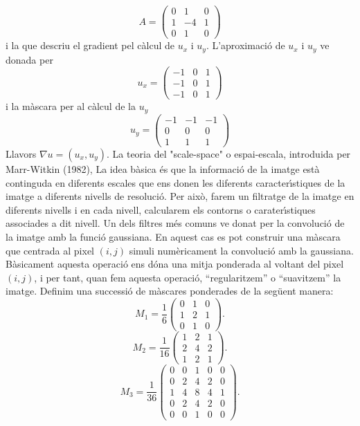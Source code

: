 \documentclass{article}
\begin{document}
$$
A=\left(\begin{array}{ccc}
0 & 1 & 0 \\
1 & -4 & 1 \\
0 & 1 & 0 \end{array}\right)$$
 i la que descriu el gradient pel c\`{a}lcul de $u_x$ i $u_y$. L'aproximaci\'{o} de $u_x$ i $u_y$ ve donada
 per
$$
u_x=\left( \begin{array}{ccc} -1 & 0 & 1\\ -1 & 0 & 1 \\ -1 & 0 & 1 \end{array}\right)
$$ i la m\`{a}scara per al
c\`{a}lcul de la $u_y$
$$
u_y=\left(\begin{array}{ccc} -1 & -1 & -1 \\ 0 & 0 & 0 \\ 1 & 1 & 1 \end{array}\right)$$
 Llavors $\nabla u=(u_x,u_y)$.
\newline La teoria del "scale-space" o espai-escala, introduida per Marr-Witkin (1982),
La idea b\`{a}sica \'{e}s que la informaci\'{o} de la imatge est\`{a} continguda en diferents escales que ens donen
les diferents caracter\'{\i}stiques de la imatge a diferents nivells de resoluci\'{o}. Per aix\`{o}, farem un
filtratge de la imatge en diferents nivells i en cada nivell, calcularem els contorns o
carater\'{\i}stiques associades a dit nivell.
\newline
 Un dels filtres m\'{e}s comuns ve donat per la convoluci\'{o} de la imatge amb la funci\'{o} gaussiana. En
aquest cas es pot construir una m\`{a}scara que centrada al pixel $(i,j)$ simuli num\`{e}ricament la
convoluci\'{o} amb la gaussiana. B\`{a}sicament aquesta operaci\'{o} ens d\'{o}na una mitja ponderada al voltant
del pixel $(i,j)$, i per tant, quan fem aquesta operaci\'{o},
 ``regularitzem'' o ``suavitzem'' la imatge. Definim una successi\'{o} de m\`{a}scares ponderades de la
 seg\"{u}ent manera:
 $$
M_1=\frac{1}{6}\left(\begin{array}{ccc} 0 & 1 & 0\\ 1 & 2 & 1\\ 0 & 1 & 0 \end{array}\right).$$
 $$
M_2=\frac{1}{16}\left(\begin{array}{ccc} 1 & 2 & 1 \\ 2 & 4 & 2 \\ 1 & 2 & 1 \end{array}\right).$$
 $$
M_3=\frac{1}{36}\left(\begin{array}{ccccc} 0 & 0 & 1 & 0 & 0 \\ 0 & 2 & 4 & 2 & 0 \\ 1 & 4 & 8 & 4 & 1 \\ 0
& 2 & 4 & 2 & 0 \\ 0 & 0 & 1 & 0 & 0 \end{array}\right).$$
\end{document}
